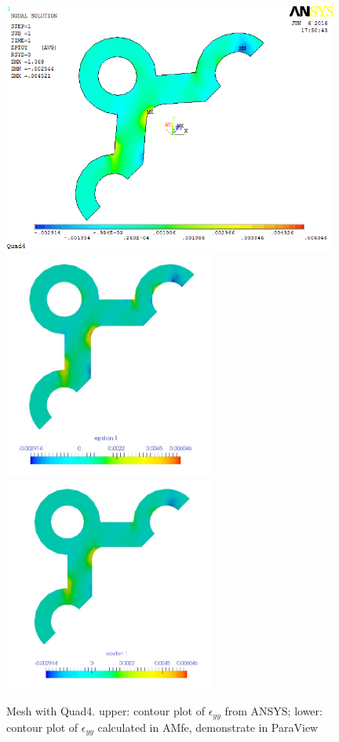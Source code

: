 \begin{figure}[htbp]
	\begin{center}
		\includegraphics[width=11cm,clip]{Quad4_Eyy.png} 	
		\includegraphics[width=7cm,clip]{Quad4_Eyy_PD.png} 		
		\includegraphics[width=7cm,clip]{Quad4_Eyy_P.png} 		
		\caption{Mesh with Quad4. upper: contour plot of $\epsilon_{yy}$ from ANSYS; lower: contour plot of $\epsilon_{yy}$ calculated in AMfe, demonstrate in ParaView} \label{fig: Quad4_Eyy}
	\end{center}
\end{figure}
\clearpage 

